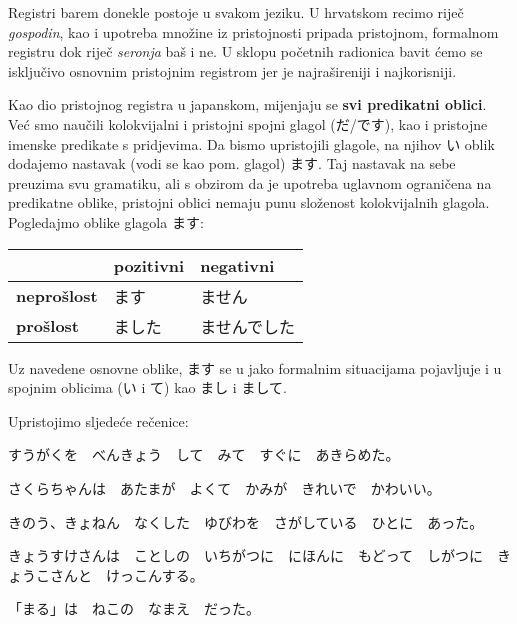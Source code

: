 	
	Registri barem donekle postoje u svakom jeziku. U hrvatskom recimo riječ \textit{gospodin}, kao i upotreba množine iz pristojnosti pripada pristojnom, formalnom registru dok riječ \textit{seronja} baš i ne. U sklopu početnih radionica bavit ćemo se isključivo osnovnim pristojnim registrom jer je najrašireniji i najkorisniji.
	
	\newpage
	
	Kao dio pristojnog registra u japanskom, mijenjaju se \textbf{svi predikatni oblici}\footnotemark[1]. Već smo naučili kolokvijalni i pristojni spojni glagol (だ/です), kao i pristojne imenske predikate s pridjevima. Da bismo upristojili glagole, na njihov い oblik dodajemo nastavak (vodi se kao pom. glagol) ます. Taj nastavak na sebe preuzima svu gramatiku, ali s obzirom da je upotreba uglavnom ograničena na predikatne oblike, pristojni oblici nemaju punu složenost kolokvijalnih glagola. Pogledajmo oblike glagola ます:
	
	\vspace{10pt}
	\begin{tabular}{|l|l|l|}
		\hline
		&\textbf{pozitivni}&\textbf{negativni}\\
		\hline
		\textbf{neprošlost}&ます&ません\\
		\hline
		\textbf{prošlost}&ました&ませんでした\\
		\hline
	\end{tabular}

	\vspace{10pt}
	Uz navedene osnovne oblike, ます se u jako formalnim situacijama pojavljuje i u spojnim oblicima (い i て) kao まし i まして.
	
	
	\begin{reibun}
	\end{reibun}
	
	\begin{reibun}
	\end{reibun}

	
	\begin{mondai}{Upristojimo sljedeće rečenice:}
		\item すうがくを　べんきょう　して　みて　すぐに　あきらめた。
		\item さくらちゃんは　あたまが　よくて　かみが　きれいで　かわいい。
		\item きのう、きょねん　なくした　ゆびわを　さがしている　ひとに　あった。
		\item きょうすけさんは　ことしの　いちがつに　にほんに　もどって　しがつに　きょうこさんと　けっこんする。
		\item 「まる」は　ねこの　なまえ　だった。
	\end{mondai}
